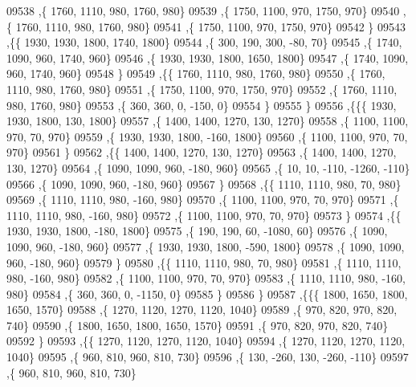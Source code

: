 \begin{DoxyCode}
09538     ,\{  1760,  1110,   980,  1760,   980\}
09539     ,\{  1750,  1100,   970,  1750,   970\}
09540     ,\{  1760,  1110,   980,  1760,   980\}
09541     ,\{  1750,  1100,   970,  1750,   970\}
09542     \}
09543    ,\{\{  1930,  1930,  1800,  1740,  1800\}
09544     ,\{   300,   190,   300,   -80,    70\}
09545     ,\{  1740,  1090,   960,  1740,   960\}
09546     ,\{  1930,  1930,  1800,  1650,  1800\}
09547     ,\{  1740,  1090,   960,  1740,   960\}
09548     \}
09549    ,\{\{  1760,  1110,   980,  1760,   980\}
09550     ,\{  1760,  1110,   980,  1760,   980\}
09551     ,\{  1750,  1100,   970,  1750,   970\}
09552     ,\{  1760,  1110,   980,  1760,   980\}
09553     ,\{   360,   360,     0,  -150,     0\}
09554     \}
09555    \}
09556   ,\{\{\{  1930,  1930,  1800,   130,  1800\}
09557     ,\{  1400,  1400,  1270,   130,  1270\}
09558     ,\{  1100,  1100,   970,    70,   970\}
09559     ,\{  1930,  1930,  1800,  -160,  1800\}
09560     ,\{  1100,  1100,   970,    70,   970\}
09561     \}
09562    ,\{\{  1400,  1400,  1270,   130,  1270\}
09563     ,\{  1400,  1400,  1270,   130,  1270\}
09564     ,\{  1090,  1090,   960,  -180,   960\}
09565     ,\{    10,    10,  -110, -1260,  -110\}
09566     ,\{  1090,  1090,   960,  -180,   960\}
09567     \}
09568    ,\{\{  1110,  1110,   980,    70,   980\}
09569     ,\{  1110,  1110,   980,  -160,   980\}
09570     ,\{  1100,  1100,   970,    70,   970\}
09571     ,\{  1110,  1110,   980,  -160,   980\}
09572     ,\{  1100,  1100,   970,    70,   970\}
09573     \}
09574    ,\{\{  1930,  1930,  1800,  -180,  1800\}
09575     ,\{   190,   190,    60, -1080,    60\}
09576     ,\{  1090,  1090,   960,  -180,   960\}
09577     ,\{  1930,  1930,  1800,  -590,  1800\}
09578     ,\{  1090,  1090,   960,  -180,   960\}
09579     \}
09580    ,\{\{  1110,  1110,   980,    70,   980\}
09581     ,\{  1110,  1110,   980,  -160,   980\}
09582     ,\{  1100,  1100,   970,    70,   970\}
09583     ,\{  1110,  1110,   980,  -160,   980\}
09584     ,\{   360,   360,     0, -1150,     0\}
09585     \}
09586    \}
09587   ,\{\{\{  1800,  1650,  1800,  1650,  1570\}
09588     ,\{  1270,  1120,  1270,  1120,  1040\}
09589     ,\{   970,   820,   970,   820,   740\}
09590     ,\{  1800,  1650,  1800,  1650,  1570\}
09591     ,\{   970,   820,   970,   820,   740\}
09592     \}
09593    ,\{\{  1270,  1120,  1270,  1120,  1040\}
09594     ,\{  1270,  1120,  1270,  1120,  1040\}
09595     ,\{   960,   810,   960,   810,   730\}
09596     ,\{   130,  -260,   130,  -260,  -110\}
09597     ,\{   960,   810,   960,   810,   730\}

\end{DoxyCode}
